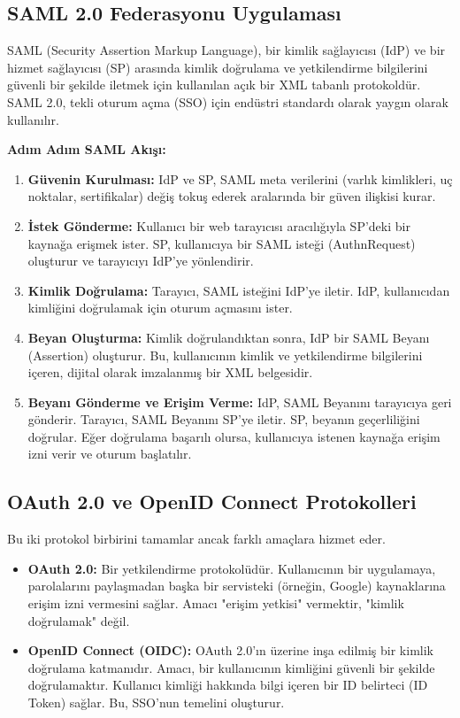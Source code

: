 \subsection{SAML 2.0 Federasyonu Uygulaması}

SAML (Security Assertion Markup Language), bir kimlik sağlayıcısı (IdP) ve bir hizmet sağlayıcısı (SP) arasında kimlik doğrulama ve yetkilendirme bilgilerini güvenli bir şekilde iletmek için kullanılan açık bir XML tabanlı protokoldür. SAML 2.0, tekli oturum açma (SSO) için endüstri standardı olarak yaygın olarak kullanılır.

\textbf{Adım Adım SAML Akışı:}
\begin{enumerate}
    \item \textbf{Güvenin Kurulması:} IdP ve SP, SAML meta verilerini (varlık kimlikleri, uç noktalar, sertifikalar) değiş tokuş ederek aralarında bir güven ilişkisi kurar.
    \item \textbf{İstek Gönderme:} Kullanıcı bir web tarayıcısı aracılığıyla SP'deki bir kaynağa erişmek ister. SP, kullanıcıya bir SAML isteği (AuthnRequest) oluşturur ve tarayıcıyı IdP'ye yönlendirir.
    \item \textbf{Kimlik Doğrulama:} Tarayıcı, SAML isteğini IdP'ye iletir. IdP, kullanıcıdan kimliğini doğrulamak için oturum açmasını ister.
    \item \textbf{Beyan Oluşturma:} Kimlik doğrulandıktan sonra, IdP bir SAML Beyanı (Assertion) oluşturur. Bu, kullanıcının kimlik ve yetkilendirme bilgilerini içeren, dijital olarak imzalanmış bir XML belgesidir.
    \item \textbf{Beyanı Gönderme ve Erişim Verme:} IdP, SAML Beyanını tarayıcıya geri gönderir. Tarayıcı, SAML Beyanını SP'ye iletir. SP, beyanın geçerliliğini doğrular. Eğer doğrulama başarılı olursa, kullanıcıya istenen kaynağa erişim izni verir ve oturum başlatılır.
\end{enumerate}

\subsection{OAuth 2.0 ve OpenID Connect Protokolleri}

Bu iki protokol birbirini tamamlar ancak farklı amaçlara hizmet eder.
\begin{itemize}
    \item \textbf{OAuth 2.0:} Bir yetkilendirme protokolüdür. Kullanıcının bir uygulamaya, parolalarını paylaşmadan başka bir servisteki (örneğin, Google) kaynaklarına erişim izni vermesini sağlar. Amacı "erişim yetkisi" vermektir, "kimlik doğrulamak" değil.
    \item \textbf{OpenID Connect (OIDC):} OAuth 2.0'ın üzerine inşa edilmiş bir kimlik doğrulama katmanıdır. Amacı, bir kullanıcının kimliğini güvenli bir şekilde doğrulamaktır. Kullanıcı kimliği hakkında bilgi içeren bir ID belirteci (ID Token) sağlar. Bu, SSO'nun temelini oluşturur.
\end{itemize}

